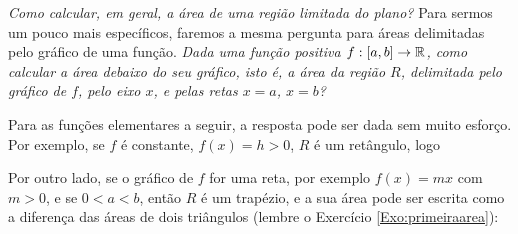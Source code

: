 \emph{Como calcular, em geral, a área de uma região limitada do plano?}
Para sermos um pouco mais específicos, faremos a mesma pergunta para áreas
delimitadas pelo gráfico de uma função. \emph{Dada uma função positiva
$f:[a,b]\to \mathbb{R}$,
como calcular a área debaixo do seu gráfico, isto é, a área da região $R$,
delimitada pelo gráfico de $f$, pelo eixo $x$, e pelas retas $x=a$, $x=b$?}
\begin{center}
\begin{bmlimage}\end{bmlimage}
\end{center}


Para as funções elementares a seguir, a resposta pode ser dada sem muito
esforço.
Por exemplo, se $f$ é constante, $f(x)=h>0$, $R$ é um retângulo, logo

\begin{center}
\begin{bmlimage}\end{bmlimage}
\end{center}

Por outro lado, se o gráfico de $f$ for uma reta, por exemplo $f(x)=mx$ 
com $m>0$, e se $0<a<b$, então $R$ é um trapézio, e a sua área pode ser
 escrita como a diferença das áreas de dois triângulos (lembre o
Exercício \ref{Exo:primeiraarea}):

